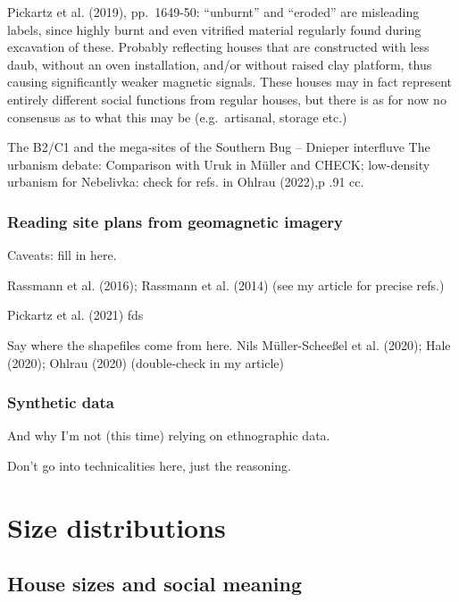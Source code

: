 \documentclass[
  12pt,
  a4paper, twoside]{book}
\begin{document}
Pickartz et al. (2019), pp.~1649-50: ``unburnt'' and ``eroded'' are misleading labels, since highly burnt and even vitrified material regularly found during excavation of these. Probably reflecting houses that are constructed with less daub, without an oven installation, and/or without raised clay platform, thus causing significantly weaker magnetic signals. These houses may in fact represent entirely different social functions from regular houses, but there is as for now no consensus as to what this may be (e.g.~artisanal, storage etc.)

The B2/C1 and the mega-sites of the Southern Bug -- Dnieper interfluve The urbanism debate: Comparison with Uruk in Müller and CHECK; low-density urbanism for Nebelivka: check for refs. in Ohlrau (2022),p .91 cc.

\hypertarget{reading-site-plans-from-geomagnetic-imagery}{%
\section{Reading site plans from geomagnetic imagery}\label{reading-site-plans-from-geomagnetic-imagery}}

Caveats: fill in here.

Rassmann et al. (2016); Rassmann et al. (2014) (see my article for precise refs.)

Pickartz et al. (2021) fds

Say where the shapefiles come from here. Nils Müller-Scheeßel et al. (2020); Hale (2020); Ohlrau (2020) (double-check in my article)

\hypertarget{synthetic-data}{%
\section{Synthetic data}\label{synthetic-data}}

And why I'm not (this time) relying on ethnographic data.

Don't go into technicalities here, just the reasoning.

\hypertarget{part-size-distributions}{%
\part{Size distributions}\label{part-size-distributions}}

\hypertarget{house-sizes-theory}{%
\chapter{House sizes and social meaning}\label{house-sizes-theory}}
\end{document}

